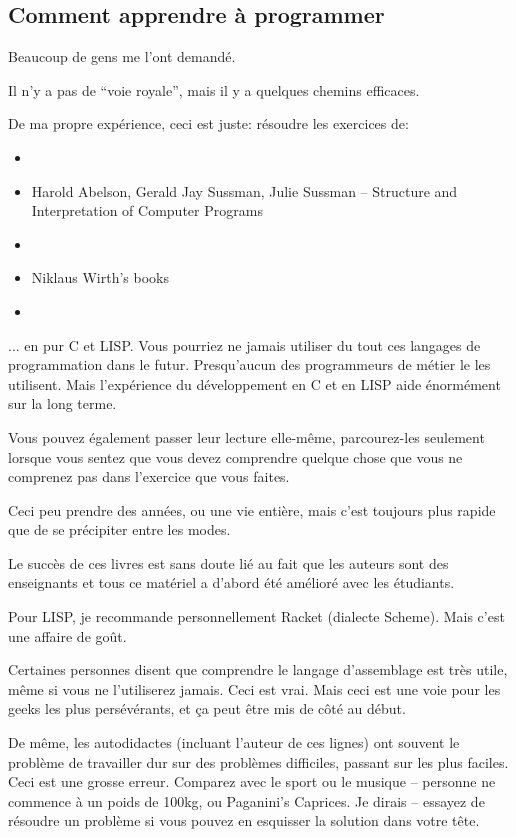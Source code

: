 \subsection*{Comment apprendre à programmer}

Beaucoup de gens me l'ont demandé.

Il n'y a pas de ``voie royale'', mais il y a quelques chemins efficaces.

De ma propre expérience, ceci est juste: résoudre les exercices de:

\begin{itemize}
\item \KRBook
\item Harold Abelson, Gerald Jay Sussman, Julie Sussman -- Structure and Interpretation of Computer Programs
\item \TAOCP
\item Niklaus Wirth's books
\item \RobPikePractice
\end{itemize}

... en pur C et LISP.
Vous pourriez ne jamais utiliser du tout ces langages de programmation dans le futur.
Presqu'aucun des programmeurs de métier le les utilisent. Mais l'expérience du développement
en C et en LISP aide énormément sur la long terme.

Vous pouvez également passer leur lecture elle-même, parcourez-les seulement lorsque
vous sentez que vous devez comprendre quelque chose que vous ne comprenez pas dans
l'exercice que vous faites.

Ceci peu prendre des années, ou une vie entière, mais c'est toujours plus rapide
que de se précipiter entre les modes.

Le succès de ces livres est sans doute lié au fait que les auteurs sont des enseignants
et tous ce matériel a d'abord été amélioré avec les étudiants.

Pour LISP, je recommande personnellement Racket (dialecte Scheme). Mais c'est une
affaire de goût.

Certaines personnes disent que comprendre le langage d'assemblage est très utile,
même si vous ne l'utiliserez jamais.
Ceci est vrai.
Mais ceci est une voie pour les geeks les plus persévérants, et ça peut être mis de
côté au début.

De même, les autodidactes (incluant l'auteur de ces lignes) ont souvent le problème
de travailler dur sur des problèmes difficiles, passant sur les plus faciles.
Ceci est une grosse erreur.
Comparez avec le sport ou le musique -- personne ne commence à un poids de 100kg,
ou Paganini's Caprices.
Je dirais -- essayez de résoudre un problème si vous pouvez en esquisser la solution
dans votre tête.

